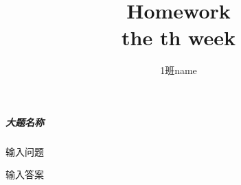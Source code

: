 \documentclass[UTF8]{ctexart}
\title{\textbf{Homework}\\ \large the th week}
\author{\slshape物理1班\quad name \quad 20172801}
\begin{document}

\subparagraph{大题名称}

    \begin{Question}
        \item 输入问题

\begin{Answer}
    \begin{Solve}[Solve:]
        输入答案
    \end{Solve}
\end{Answer}

    \end{Question}
\end{document}
